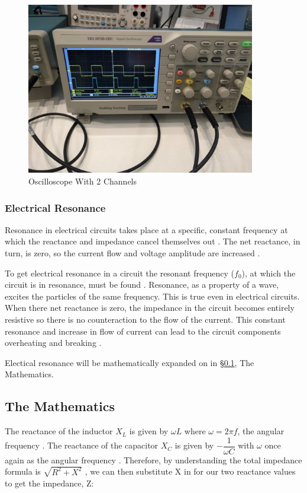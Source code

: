 \documentclass[12pt]{article}
\begin{document}
\begin{figure}[ht]
    \centering
    \includegraphics[width=10cm]{oscillo.jpg}
    \caption{\centering Oscilloscope With 2 Channels \protect\cite{oscillopic}}
\end{figure}

\subsubsection{Electrical Resonance} \label{sec:1.2.2}

Resonance in electrical circuits takes place at a specific, constant frequency at which the reactance and impedance cancel themselves out
\cite{geekresonance}.
The net reactance, in turn, is zero, so the current flow and voltage amplitude are increased
\cite{geekresonance}.

To get electrical resonance in a circuit the resonant frequency ($f_0$), at which the circuit is in resonance, must be found
\cite{geekresonance,eeresonance}.
Resonance, as a property of a wave, excites the particles of the same frequency. This is true even in electrical circuits.
When there net reactance is zero, the impedance in the circuit becomes entirely resistive so there is no counteraction to the flow of the current.
This constant resonance and increase in flow of current can lead to the circuit components overheating and breaking
\cite{geekresonance}.

Electical resonance will be mathematically expanded on in §\ref{sec:1.3}, The Mathematics.

\subsection{The Mathematics}\label{sec:1.3}

The reactance of the inductor $X_L$ is given by $\omega L$ where $\omega = 2 \pi f$, the angular frequency
\cite{UCD,isaacimpedance}.
The reactance of the capacitor $X_C$ is given by $- \dfrac{1}{\omega C}$ with $\omega$ once again as the angular frequency
\cite{UCD,isaacimpedance}.
Therefore, by understanding the total impedance formula is $\sqrt{R^2 + X^2}$
\cite{isaacimpedance},
we can then substitute X in for our two reactance values to get the impedance, Z:
\end{document}
